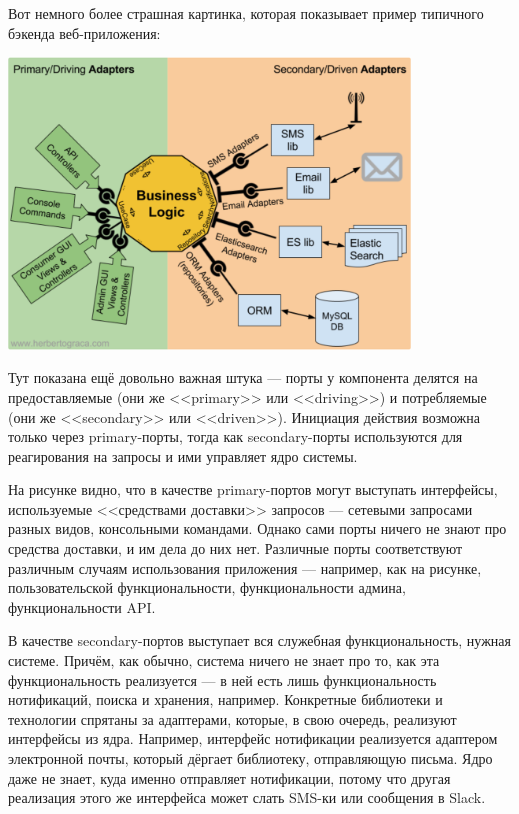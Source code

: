\documentclass{../../text-style}
\begin{document}
Вот немного более страшная картинка, которая показывает пример типичного бэкенда веб-приложения:

\begin{center}
    \includegraphics[width=0.8\textwidth]{hexagonalArchitectureDetails.png}
\end{center}

Тут показана ещё довольно важная штука --- порты у компонента делятся на предоставляемые (они же <<primary>> или <<driving>>) и потребляемые (они же <<secondary>> или <<driven>>). Инициация действия возможна только через primary-порты, тогда как secondary-порты используются для реагирования на запросы и ими управляет ядро системы.

На рисунке видно, что в качестве primary-портов могут выступать интерфейсы, используемые <<средствами доставки>> запросов --- сетевыми запросами разных видов, консольными командами. Однако сами порты ничего не знают про средства доставки, и им дела до них нет. Различные порты соответствуют различным случаям использования приложения --- например, как на рисунке, пользовательской функциональности, функциональности админа, функциональности API.

В качестве secondary-портов выступает вся служебная функциональность, нужная системе. Причём, как обычно, система ничего не знает про то, как эта функциональность реализуется --- в ней есть лишь функциональность нотификаций, поиска и хранения, например. Конкретные библиотеки и технологии спрятаны за адаптерами, которые, в свою очередь, реализуют интерфейсы из ядра. Например, интерфейс нотификации реализуется адаптером электронной почты, который дёргает библиотеку, отправляющую письма. Ядро даже не знает, куда именно отправляет нотификации, потому что другая реализация этого же интерфейса может слать SMS-ки или сообщения в Slack.
\end{document}
